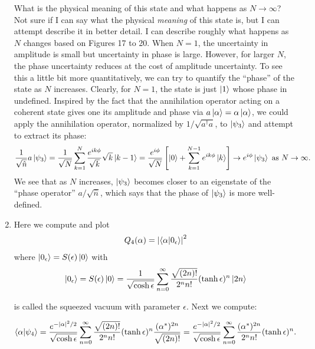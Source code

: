 \documentclass{article}
\theoremstyle{definition}
\newcommand{\al}{\alpha}
\newcommand{\f}[2]{\frac{#1}{#2}}
\newcommand{\lb}{\left[}
\newcommand{\rb}{\right]}
\begin{document}
\begin{enumerate}[label=\alph*)]
	What is the physical meaning of this state and what happens as $N\to \infty$? Not sure if I can say what the physical \textit{meaning} of this state is, but I can attempt describe it in better detail. I can describe roughly what happens as $N$ changes based on Figures 17 to 20. When $N=1$,  the uncertainty in amplitude is small but uncertainty in phase is large. However, for larger $N$, the phase uncertainty reduces at the cost of amplitude uncertainty. To see this a little bit more quantitatively, we can try to quantify the ``phase'' of the state as $N$ increases. Clearly, for $N=1$, the state is just $\ket{1}$ whose phase in undefined.  Inspired by the fact that the annihilation operator acting on a coherent state gives one its amplitude and phase via $a\ket{\al} = \al\ket{\al}$, we could apply the annihilation operator, normalized by $1/\sqrt{{a^\dagger a}}$, to $\ket{\psi_3}$ and attempt to extract its phase:
	\begin{align*}
	\f{1}{\sqrt{\hat{n}}}a\ket{\psi_3} 
	= \f{1}{\sqrt{N}} \sum_{k=1}^N \f{e^{ik\phi}}{\sqrt{k}} \sqrt{k} \ket{k-1}
	= \f{e^{i\phi}}{\sqrt{N}}\lb \ket{0} + \sum_{k=1}^{N-1} e^{ik\phi} \ket{k} \rb \to e^{i\phi} \ket{\psi_3} \text{ as } N\to \infty.
	\end{align*}
	We see that as $N$ increases, $\ket{\psi_3}$ becomes closer to an eigenstate of the ``phase operator'' $a/\sqrt{\hat{n}}$, which says that the phase of $\ket{\psi_3}$ is more well-defined. 

	
	
	\item  Here we compute and plot 
	\begin{align*}
		Q_4(\al) = \abs{\braket{\al}{0_\epsilon}}^2
	\end{align*}
	where $\ket{0_\epsilon} = S(\epsilon)\ket{0}$ with
	\begin{align*}
		\ket{0_\epsilon} = S(\epsilon)\ket{0} = 
		\f{1}{\sqrt{\cosh \epsilon}} \sum_{n=0}^\infty \f{ \sqrt{(2n)!} }{2^n n!} (\tanh \epsilon)^n \ket{2n}
	\end{align*}
	
	is called the squeezed vacuum with parameter $\epsilon$. Next we compute:
	
	
	\begin{align*}
		\braket{\al}{\psi_4} = \f{e^{-\abs{\al}^2/2}}{\sqrt{\cosh \epsilon}} \sum_{n=0}^\infty \f{ \sqrt{(2n)!} }{2^n n!} (\tanh \epsilon)^n \f{(\al^*)^{2n}}{\sqrt{(2n)!}} = 
		\f{e^{-\abs{\al}^2/2}}{\sqrt{\cosh \epsilon}} \sum_{n=0}^\infty \f{ (\al^*)^{2n} }{2^n n!} (\tanh \epsilon)^n.
	\end{align*}
	

\end{enumerate}
\end{document}
